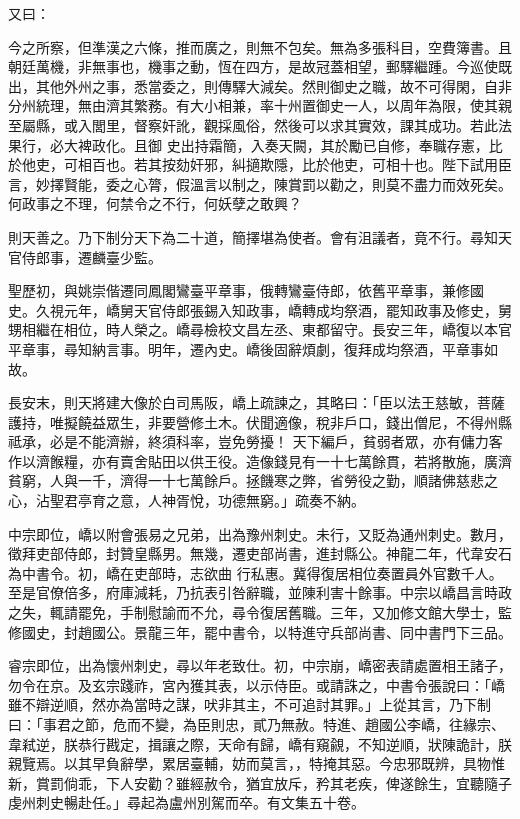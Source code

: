 \begin{pinyinscope}
 又曰：



 今之所察，但準漢之六條，推而廣之，則無不包矣。無為多張科目，空費簿書。且朝廷萬機，非無事也，機事之動，恆在四方，是故冠蓋相望，郵驛繼踵。今巡使既出，其他外州之事，悉當委之，則傳驛大減矣。然則御史之職，故不可得閑，自非分州統理，無由濟其繁務。有大小相兼，率十州置御史一人，以周年為限，使其親至屬縣，或入閭里，督察奸訛，觀採風俗，然後可以求其實效，課其成功。若此法果行，必大裨政化。且御
 史出持霜簡，入奏天闕，其於勵已自修，奉職存憲，比於他吏，可相百也。若其按劾奸邪，糾擿欺隱，比於他吏，可相十也。陛下試用臣言，妙擇賢能，委之心膂，假溫言以制之，陳賞罰以勸之，則莫不盡力而效死矣。何政事之不理，何禁令之不行，何妖孽之敢興？



 則天善之。乃下制分天下為二十道，簡擇堪為使者。會有沮議者，竟不行。尋知天官侍郎事，遷麟臺少監。



 聖歷初，與姚崇偕遷同鳳閣鸞臺平章事，俄轉鸞臺侍郎，依舊平章事，兼修國
 史。久視元年，嶠舅天官侍郎張錫入知政事，嶠轉成均祭酒，罷知政事及修史，舅甥相繼在相位，時人榮之。嶠尋檢校文昌左丞、東都留守。長安三年，嶠復以本官平章事，尋知納言事。明年，遷內史。嶠後固辭煩劇，復拜成均祭酒，平章事如故。



 長安末，則天將建大像於白司馬阪，嶠上疏諫之，其略曰：「臣以法王慈敏，菩薩護持，唯擬饒益眾生，非要營修土木。伏聞適像，稅非戶口，錢出僧尼，不得州縣祗承，必是不能濟辦，終須科率，豈免勞擾！
 天下編戶，貧弱者眾，亦有傭力客作以濟餱糧，亦有賣舍貼田以供王役。造像錢見有一十七萬餘貫，若將散施，廣濟貧窮，人與一千，濟得一十七萬餘戶。拯饑寒之弊，省勞役之勤，順諸佛慈悲之心，沾聖君亭育之意，人神胥悅，功德無窮。」疏奏不納。



 中宗即位，嶠以附會張易之兄弟，出為豫州刺史。未行，又貶為通州刺史。數月，徵拜吏部侍郎，封贊皇縣男。無幾，遷吏部尚書，進封縣公。神龍二年，代韋安石為中書令。初，嶠在吏部時，志欲曲
 行私惠。冀得復居相位奏置員外官數千人。至是官僚倍多，府庫減耗，乃抗表引咎辭職，並陳利害十餘事。中宗以嶠昌言時政之失，輒請罷免，手制慰諭而不允，尋令復居舊職。三年，又加修文館大學士，監修國史，封趙國公。景龍三年，罷中書令，以特進守兵部尚書、同中書門下三品。



 睿宗即位，出為懷州刺史，尋以年老致仕。初，中宗崩，嶠密表請處置相王諸子，勿令在京。及玄宗踐祚，宮內獲其表，以示侍臣。或請誅之，中書令張說曰：「嶠
 雖不辯逆順，然亦為當時之謀，吠非其主，不可追討其罪。」上從其言，乃下制曰：「事君之節，危而不變，為臣則忠，貳乃無赦。特進、趙國公李嶠，往緣宗、韋弒逆，朕恭行戡定，揖讓之際，天命有歸，嶠有窺覦，不知逆順，狀陳詭計，朕親覽焉。以其早負辭學，累居臺輔，妨而莫言，，特掩其惡。今忠邪既辨，具物惟新，賞罰倘乖，下人安勸？雖經赦令，猶宜放斥，矜其老疾，俾遂餘生，宜聽隨子虔州刺史暢赴任。」尋起為盧州別駕而卒。有文集五十卷。




\end{pinyinscope}

